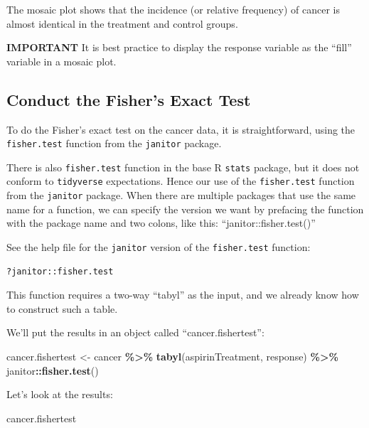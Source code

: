 \documentclass[
]{book}
\newenvironment{Shaded}{\begin{snugshade}}{\end{snugshade}}
\newcommand{\FunctionTok}[1]{\textcolor[rgb]{0.13,0.29,0.53}{\textbf{#1}}}
\newcommand{\NormalTok}[1]{#1}
\newcommand{\OtherTok}[1]{\textcolor[rgb]{0.56,0.35,0.01}{#1}}
\newcommand{\SpecialCharTok}[1]{\textcolor[rgb]{0.81,0.36,0.00}{\textbf{#1}}}
\begin{document}
The mosaic plot shows that the incidence (or relative frequency) of cancer is almost identical in the treatment and control groups.

\textbf{IMPORTANT }
It is best practice to display the response variable as the ``fill'' variable in a mosaic plot.

\subsection{Conduct the Fisher's Exact Test}\label{do_fisher}

To do the Fisher's exact test on the cancer data, it is straightforward, using the \texttt{fisher.test} function from the \texttt{janitor} package.

There is also \texttt{fisher.test} function in the base R \texttt{stats} package, but it does not conform to \texttt{tidyverse} expectations. Hence our use of the \texttt{fisher.test} function from the \texttt{janitor} package. When there are multiple packages that use the same name for a function, we can specify the version we want by prefacing the function with the package name and two colons, like this: ``janitor::fisher.test()''

See the help file for the \texttt{janitor} version of the \texttt{fisher.test} function:

\begin{verbatim}
?janitor::fisher.test
\end{verbatim}

This function requires a two-way ``tabyl'' as the input, and we already know how to construct such a table.

We'll put the results in an object called ``cancer.fishertest'':

\begin{Shaded}
\begin{Highlighting}[]
\NormalTok{cancer.fishertest }\OtherTok{\textless{}{-}}\NormalTok{ cancer }\SpecialCharTok{\%\textgreater{}\%}
    \FunctionTok{tabyl}\NormalTok{(aspirinTreatment, response) }\SpecialCharTok{\%\textgreater{}\%}
\NormalTok{    janitor}\SpecialCharTok{::}\FunctionTok{fisher.test}\NormalTok{()}
\end{Highlighting}
\end{Shaded}

Let's look at the results:

\begin{Shaded}
\begin{Highlighting}[]
\NormalTok{cancer.fishertest}
\end{Highlighting}
\end{Shaded}
\end{document}
